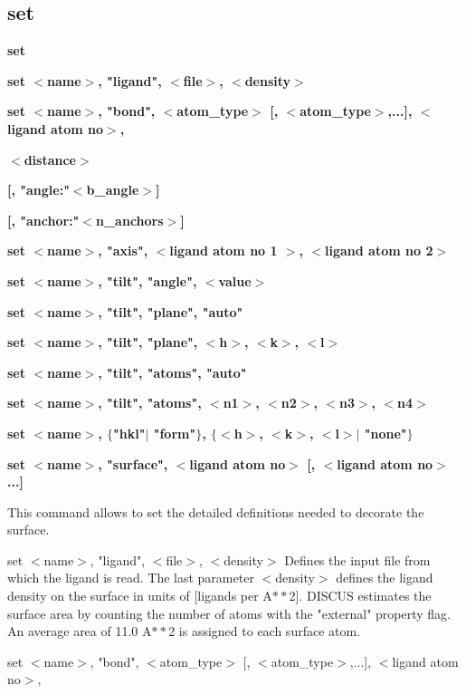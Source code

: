 \subsection*{set}
{\bf set \par }
{\bf set $ <$name$> $, "ligand", $ <$file$> $, $ <$density$> $ \par }
{\bf set $ <$name$> $, "bond", $ <$atom\_type$> $ [, $ <$atom\_type$> $,...], $ <$ligand atom no$> $, \par }
{\bf                                                      $ <$distance$> $ \par }
{\bf                                  [, "angle:"$ <$b\_angle$> $] \par }
{\bf                                  [, "anchor:"$ <$n\_anchors$> $] \par }
{\bf set $ <$name$> $, "axis", $ <$ligand atom no 1 $> $, $ <$ligand atom no 2$> $ \par }
{\bf  \par }
{\bf set $ <$name$> $, "tilt", "angle", $ <$value$> $ \par }
{\bf set $ <$name$> $, "tilt", "plane", "auto" \par }
{\bf set $ <$name$> $, "tilt", "plane", $ <$h$> $, $ <$k$> $, $ <$l$> $ \par }
{\bf set $ <$name$> $, "tilt", "atoms", "auto" \par }
{\bf set $ <$name$> $, "tilt", "atoms", $ <$n1$> $, $ <$n2$> $, $ <$n3$> $, $ <$n4$> $ \par }
{\bf  \par }
{\bf set $ <$name$> $, $ \{$"hkl"$| $ "form"$\} $, $ \{$$ <$h$> $, $ <$k$> $, $ <$l$> $$| $ "none"$\} $ \par }
{\bf set $ <$name$> $, "surface", $ <$ligand atom no$> $ [, $ <$ligand atom no$> $...] \par }
\par
\vspace{3pt}
This command allows to set the detailed definitions needed to decorate the 
surface. 
\par
set $ <$name$> $, "ligand", $ <$file$> $, $ <$density$> $ 
    Defines the input file from which the ligand is read. 
    The last parameter $ <$density$> $ defines the ligand density on the surface in 
    units of [ligands per A$**$2]. DISCUS estimates the surface area by counting 
    the number of atoms with the "external" property flag. An average area of 
    11.0 A$**$2 is assigned to each surface atom. 
\par
set $ <$name$> $, "bond", $ <$atom\_type$> $ [, $ <$atom\_type$> $,...], $ <$ligand atom no$> $, 
